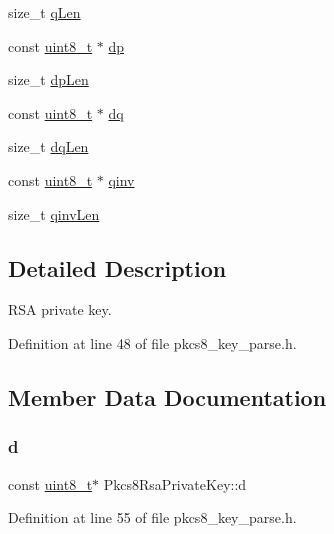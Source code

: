 \begin{DoxyCompactItemize}
\item 
size\+\_\+t \hyperlink{structPkcs8RsaPrivateKey_a14e1e918936b22f7663dc9d4592eddce}{q\+Len}
\item 
const \hyperlink{stdint_8h_aba7bc1797add20fe3efdf37ced1182c5}{uint8\+\_\+t} $\ast$ \hyperlink{structPkcs8RsaPrivateKey_a690dd0e589139f5326246b771a11552f}{dp}
\item 
size\+\_\+t \hyperlink{structPkcs8RsaPrivateKey_a633d0d5b421c4ed1c965bc0fa62e6ffc}{dp\+Len}
\item 
const \hyperlink{stdint_8h_aba7bc1797add20fe3efdf37ced1182c5}{uint8\+\_\+t} $\ast$ \hyperlink{structPkcs8RsaPrivateKey_ab38c39fc716f64b8860d31e4ba89405f}{dq}
\item 
size\+\_\+t \hyperlink{structPkcs8RsaPrivateKey_a594a1b4818730a79d59b9023a00227dd}{dq\+Len}
\item 
const \hyperlink{stdint_8h_aba7bc1797add20fe3efdf37ced1182c5}{uint8\+\_\+t} $\ast$ \hyperlink{structPkcs8RsaPrivateKey_a573ca0ff349e3265efcfdebda8442cc4}{qinv}
\item 
size\+\_\+t \hyperlink{structPkcs8RsaPrivateKey_a7e17613233cfc76c147bcf432f30488c}{qinv\+Len}
\end{DoxyCompactItemize}


\subsection{Detailed Description}
R\+SA private key. 

Definition at line 48 of file pkcs8\+\_\+key\+\_\+parse.\+h.



\subsection{Member Data Documentation}
\mbox{\label{structPkcs8RsaPrivateKey_a011925e3908af99efcc106424aed7498}} 
\subsubsection{\texorpdfstring{d}{d}}
{\footnotesize\ttfamily const \hyperlink{stdint_8h_aba7bc1797add20fe3efdf37ced1182c5}{uint8\+\_\+t}$\ast$ Pkcs8\+Rsa\+Private\+Key\+::d}



Definition at line 55 of file pkcs8\+\_\+key\+\_\+parse.\+h.

